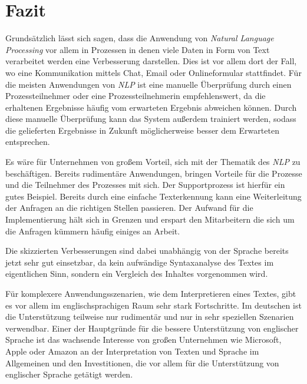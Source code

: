 \chapter{Fazit}
\label{cha:Conclusions}
Grundsätzlich lässt sich sagen, dass die Anwendung von \textit{Natural Language Processing} vor allem in Prozessen in denen viele Daten in Form von Text verarbeitet werden eine Verbesserung darstellen. Dies ist vor allem dort der Fall, wo eine Kommunikation mittels Chat, Email oder Onlineformular stattfindet. Für die meisten Anwendungen von \textit{NLP} ist eine manuelle Überprüfung durch einen Prozessteilnehmer oder eine Prozessteilnehmerin empfehlenswert, da die erhaltenen Ergebnisse häufig vom erwarteten Ergebnis abweichen können. Durch diese manuelle Überprüfung kann das System außerdem trainiert werden, sodass die gelieferten Ergebnisse in Zukunft möglicherweise besser dem Erwarteten entsprechen. 

Es wäre für Unternehmen von großem Vorteil, sich mit der Thematik des \textit{NLP} zu beschäftigen. Bereits rudimentäre Anwendungen, bringen Vorteile für die Prozesse und die Teilnehmer des Prozesses mit sich. Der Supportprozess ist hierfür ein gutes Beispiel. Bereits durch eine einfache Texterkennung kann eine Weiterleitung der Anfragen an die richtigen Stellen passieren. Der Aufwand für die Implementierung hält sich in Grenzen und erspart den Mitarbeitern die sich um die Anfragen kümmern häufig einiges an Arbeit.

Die skizzierten Verbesserungen sind dabei unabhängig von der Sprache bereits jetzt sehr gut einsetzbar, da kein aufwändige Syntaxanalyse des Textes im eigentlichen Sinn, sondern ein Vergleich des Inhaltes vorgenommen wird.

Für komplexere Anwendungsszenarien, wie dem Interpretieren eines Textes, gibt es vor allem im englischsprachigen Raum sehr stark Fortschritte. Im deutschen ist die Unterstützung teilweise nur rudimentär und nur in sehr speziellen Szenarien verwendbar. Einer der Hauptgründe für die bessere Unterstützung von englischer Sprache ist das wachsende Interesse von großen Unternehmen wie Microsoft, Apple oder Amazon an der Interpretation von Texten und Sprache im Allgemeinen und den Investitionen, die vor allem für die Unterstützung von englischer Sprache getätigt werden.
